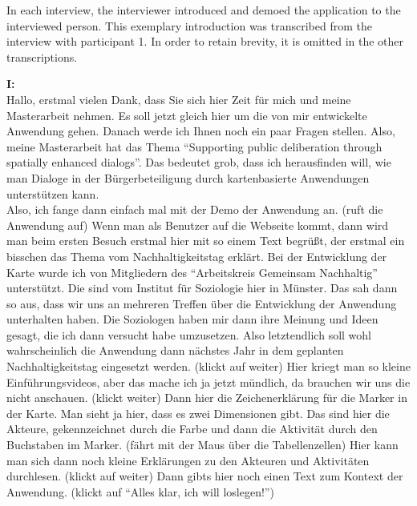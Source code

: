 \label{demo}
In each interview, the interviewer introduced and demoed the application to the interviewed person. This exemplary introduction was transcribed from the interview with participant 1. In order to retain brevity, it is omitted in the other transcriptions.

\textbf{I:}\\
Hallo, erstmal vielen Dank, dass Sie sich hier Zeit f{\"u}r mich und meine Masterarbeit nehmen. Es soll jetzt gleich hier um die von mir entwickelte Anwendung gehen. Danach werde ich Ihnen noch ein paar Fragen stellen. Also, meine Masterarbeit hat das Thema "`Supporting public deliberation through spatially enhanced dialogs"'. Das bedeutet grob, dass ich herausfinden will, wie man Dialoge in der B{\"u}rgerbeteiligung durch kartenbasierte Anwendungen unterst{\"u}tzen kann.\\
Also, ich fange dann einfach mal mit der Demo der Anwendung an. (ruft die Anwendung auf) Wenn man als Benutzer auf die Webseite kommt, dann wird man beim ersten Besuch erstmal hier mit so einem Text begr{\"u}{\ss}t, der erstmal ein bisschen das Thema vom Nachhaltigkeitstag erkl{\"a}rt. Bei der Entwicklung der Karte wurde ich von Mitgliedern des "`Arbeitskreis Gemeinsam Nachhaltig"' unterst{\"u}tzt. Die sind vom Institut f{\"u}r Soziologie hier in M{\"u}nster. Das sah dann so aus, dass wir uns an mehreren Treffen {\"u}ber die Entwicklung der Anwendung unterhalten haben. Die Soziologen haben mir dann ihre Meinung und Ideen gesagt, die ich dann versucht habe umzusetzen. Also letztendlich soll wohl wahrscheinlich die Anwendung dann n{\"a}chstes Jahr in dem geplanten Nachhaltigkeitstag eingesetzt werden. (klickt auf weiter) Hier kriegt man so kleine Einf{\"u}hrungsvideos, aber das mache ich ja jetzt m{\"u}ndlich, da brauchen wir uns die nicht anschauen. (klickt weiter) Dann hier die Zeichenerkl{\"a}rung f{\"u}r die Marker in der Karte. Man sieht ja hier, dass es zwei Dimensionen gibt. Das sind hier die Akteure, gekennzeichnet durch die Farbe und dann die Aktivit{\"a}t durch den Buchstaben im Marker. (f{\"a}hrt mit der Maus {\"u}ber die Tabellenzellen) Hier kann man sich dann noch kleine Erkl{\"a}rungen zu den Akteuren und Aktivit{\"a}ten durchlesen. (klickt auf weiter) Dann gibts hier noch einen Text zum Kontext der Anwendung. (klickt auf "`Alles klar, ich will loslegen!"')\\

